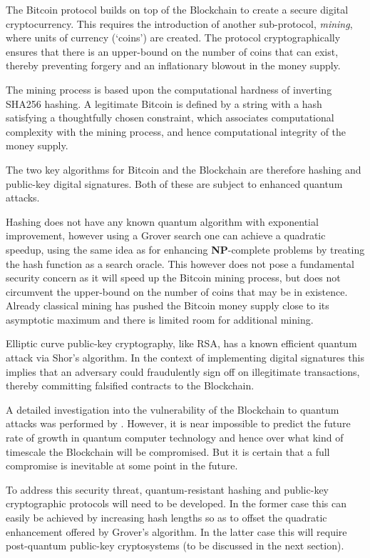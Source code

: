 The Bitcoin protocol builds on top of the Blockchain to create a secure digital cryptocurrency. This requires the introduction of another sub-protocol, \textit{mining}, where units of currency (`coins') are created. The protocol cryptographically ensures that there is an upper-bound on the number of coins that can exist, thereby preventing forgery and an inflationary blowout in the money supply.

The mining process is based upon the computational hardness of inverting SHA256 hashing. A legitimate Bitcoin is defined by a string with a hash satisfying a thoughtfully chosen constraint, which associates computational complexity with the mining process, and hence computational integrity of the money supply.

The two key algorithms for Bitcoin and the Blockchain are therefore hashing and public-key digital signatures. Both of these are subject to enhanced quantum attacks.

Hashing does not have any known quantum algorithm with exponential improvement, however using a Grover search one can achieve a quadratic speedup, using the same idea as for enhancing \textbf{NP}-complete problems by treating the hash function as a search oracle. This however does not pose a fundamental security concern as it will speed up the Bitcoin mining process, but does not circumvent the upper-bound on the number of coins that may be in existence. Already classical mining has pushed the Bitcoin money supply close to its asymptotic maximum and there is limited room for additional mining.

Elliptic curve public-key cryptography, like RSA, has a known efficient quantum attack via Shor's algorithm. In the context of implementing digital signatures this implies that an adversary could fraudulently sign off on illegitimate transactions, thereby committing falsified contracts to the Blockchain.

A detailed investigation into the vulnerability of the Blockchain to quantum attacks was performed by \cite{bib:TomamichelBlockchain}. However, it is near impossible to predict the future rate of growth in quantum computer technology and hence over what kind of timescale the Blockchain will be compromised. But it is certain that a full compromise is inevitable at some point in the future.

To address this security threat, quantum-resistant hashing and public-key cryptographic protocols will need to be developed. In the former case this can easily be achieved by increasing hash lengths so as to offset the quadratic enhancement offered by Grover's algorithm. In the latter case this will require post-quantum public-key cryptosystems (to be discussed in the next section).

